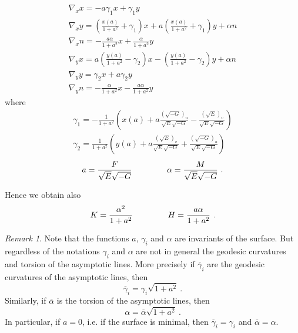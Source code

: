 \documentclass[12pt]{amsart}
\theoremstyle{definition}
\theoremstyle{remark}
\newtheorem{remark}{Remark}[section]
\newcommand{\ds}{\displaystyle}
\begin{document}
\begin{equation} \label{eq:FrenetFormulas}
	\begin{array}{l}
		\ds\nabla_xx=-a\gamma_1x+\gamma_1y \\
		\ds\nabla_xy=\left(\frac{x(a)}{1+a^2}+\gamma_1\right)x+a\left(\frac{x(a)}{1+a^2}+\gamma_1\right)y  +\alpha n \\
		\ds\nabla_xn=-\frac{a\alpha}{1+a^2}x+\frac{\alpha}{1+a^2}y     \\
		\ds\nabla_yx=a\left(\frac{y(a)}{1+a^2}-\gamma_2\right)x-\left(\frac{y(a)}{1+a^2}-\gamma_2\right)y+\alpha n   \\
		\ds\nabla_yy=\gamma_2x+a\gamma_2y  \\		
		\ds\nabla_yn=-\frac{\alpha}{1+a^2}x-\frac{a\alpha}{1+a^2}y
	\end{array}
\end{equation}
where 
\begin{equation} \label{eq:Gamma'sFormulas}
	\begin{array}{l}
		\ds\gamma_1=-\frac1{1+a^2} \left( x(a)+a\frac{(\sqrt{-G})_u}{{\sqrt E\sqrt{-G}}}-\frac{(\sqrt E)_v}{\sqrt E\sqrt{-G}} \right) \\
		\ds\gamma_2=\frac1{1+a^2} \left( y(a)+a\frac{(\sqrt E)_v}{\sqrt E\sqrt{-G}}+\frac{(\sqrt{-G})_u}{\sqrt E\sqrt{-G}} \right) 
	\end{array}
\end{equation}
$$
	a=\frac{F} {\sqrt E\sqrt {-G}}           \hspace{1.5cm}    \alpha=\frac M {\sqrt E\sqrt {-G}}\ .
$$


Hence we obtain also 
\begin{equation} \label{eq:KandHbyaAndAlpha}
	K=\frac{\alpha^2}{1+a^2}    \hspace{1.5cm}    H=\frac{a\alpha}{1+a^2} \ .
\end{equation}

\begin{remark}
Note that the functions $a$, $\gamma_i$ and $\alpha$ are invariants of the surface. 
 But regardless of the notations
 $\gamma_i$ and $\alpha$ are not in general the geodesic curvatures  and torsion
of the asymptotic lines. More precisely
if $\overline\gamma_i$ are the geodesic curvatures of the asymptotic lines, then 
$$
	\overline\gamma_i=\gamma_i\sqrt{1+a^2} \ .
$$
Similarly, if $\overline\alpha$ is  the torsion of the asymptotic lines, then
$$
	\alpha=\overline\alpha\sqrt{1+a^2} \ .
$$
In particular, if $a=0$, i.e. if the surface is minimal, then $\overline\gamma_i=\gamma_i$
and $\overline\alpha=\alpha$.
\end{remark}
\end{document}
